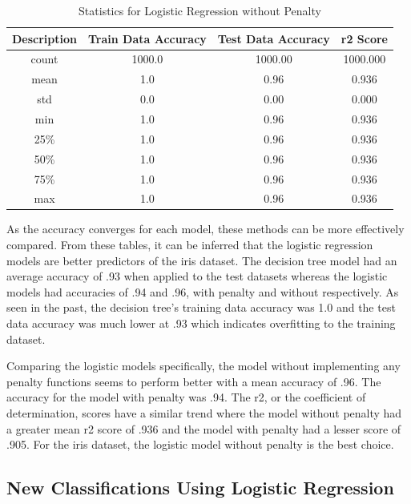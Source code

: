 \documentclass[journal]{IEEEtran}
\begin{document}
\begin{table}[h!]
\centering
\begin{tabular}{ c | c c c }
    Description & Train Data Accuracy & Test Data Accuracy & r2 Score \\
\hline
count      &         1000.0     &        1000.00 & 1000.000\\
mean       &            1.0      &          0.96 &    0.936\\
std        &            0.0      &          0.00 &    0.000\\
min        &            1.0      &          0.96 &    0.936\\
25\%       &             1.0     &           0.96 &    0.936\\
50\%       &             1.0     &           0.96 &    0.936\\
75\%        &            1.0     &           0.96 &    0.936\\
max        &            1.0      &          0.96  &   0.936\\
\end{tabular}
\caption{Statistics for Logistic Regression without Penalty}
\label{table:logRegL2}
\end{table}

As the accuracy converges for each model, these methods can be more effectively compared. From these tables, it can be inferred that the logistic regression models are better predictors of the iris dataset. The decision tree model had an average accuracy of .93 when applied to the test datasets whereas the logistic models had accuracies of .94 and .96, with penalty and without respectively. As seen in the past, the decision tree's training data accuracy was 1.0 and the test data accuracy was much lower at .93 which indicates overfitting to the training dataset. 

Comparing the logistic models specifically, the model without implementing any penalty functions seems to perform better with a mean accuracy of .96. The accuracy for the model with penalty was .94. The r2, or the coefficient of determination, scores have a similar trend where the model without penalty had a greater mean r2 score of .936 and the model with penalty had a lesser score of .905. For the iris dataset, the logistic model without penalty is the best choice.

\subsection{New Classifications Using Logistic Regression}
\end{document}
